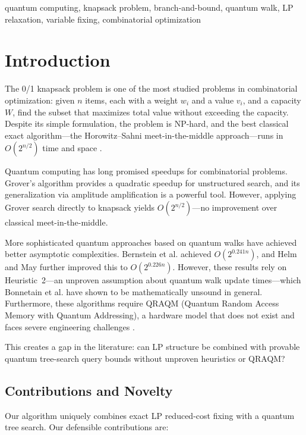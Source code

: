 \documentclass[conference]{IEEEtran} \IEEEoverridecommandlockouts
\begin{document}
\begin{IEEEkeywords} quantum computing, knapsack problem, branch-and-bound, quantum walk, LP relaxation, variable fixing, combinatorial optimization \end{IEEEkeywords}




\section{Introduction}

The 0/1 knapsack problem is one of the most studied problems in combinatorial optimization: given $n$ items, each with a weight $w_i$ and a value $v_i$, and a capacity $W$, find the subset that maximizes total value without exceeding the capacity. Despite its simple formulation, the problem is NP-hard, and the best classical exact algorithm---the Horowitz--Sahni meet-in-the-middle approach---runs in $O(2^{n/2})$ time and space \cite{ref2}.

Quantum computing has long promised speedups for combinatorial problems. Grover's algorithm \cite{ref8} provides a quadratic speedup for unstructured search, and its generalization via amplitude amplification \cite{ref11} is a powerful tool. However, applying Grover search directly to knapsack yields $O(2^{n/2})$---no improvement over classical meet-in-the-middle.

More sophisticated quantum approaches based on quantum walks have achieved better asymptotic complexities. Bernstein et al. \cite{ref16} achieved $O(2^{0.241n})$, and Helm and May \cite{ref17} further improved this to $O(2^{0.226n})$. However, these results rely on Heuristic~2---an unproven assumption about quantum walk update times---which Bonnetain et al. \cite{bonnetain2020improved} have shown to be mathematically unsound in general. Furthermore, these algorithms require QRAQM (Quantum Random Access Memory with Quantum Addressing), a hardware model that does not exist and faces severe engineering challenges \cite{ref18}.

This creates a gap in the literature: can LP structure be combined with provable quantum tree-search query bounds without unproven heuristics or QRAQM?

\subsection{Contributions and Novelty}

Our algorithm uniquely combines exact LP reduced-cost fixing with a quantum tree search. Our defensible contributions are:
\end{document}
